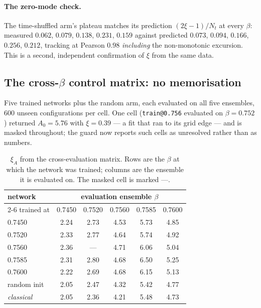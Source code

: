 \documentclass[11pt,a4paper]{article}
\newcommand{\xiA}{\xi_A}
\begin{document}
\paragraph{The zero-mode check.} The time-shuffled arm's plateau matches its
prediction $(2\xi-1)/N_t$ at every $\beta$: measured $0.062$, $0.079$, $0.138$,
$0.231$, $0.159$ against predicted $0.073$, $0.094$, $0.166$, $0.256$, $0.212$,
tracking at Pearson $0.98$ \emph{including} the non-monotonic excursion. This is
a second, independent confirmation of $\xi$ from the same data.

\subsection{The cross-$\beta$ control matrix: no memorisation}
\label{sec:cross}

Five trained networks plus the random arm, each evaluated on all five ensembles,
$600$ unseen configurations per cell. One cell (\texttt{train@0.756} evaluated on
$\beta=0.752$) returned $A_0 = 5.76$ with $\xi = 0.39$ --- a fit that ran to its
grid edge --- and is masked throughout; the guard now reports such cells as
unresolved rather than as numbers.

\begin{table}[htbp]
\centering
\caption{$\xiA$ from the cross-evaluation matrix. Rows are the $\beta$ at which
the network was trained; columns are the ensemble it is evaluated on. The
masked cell is marked ---.}
\label{tab:cross}
\begin{tabular}{@{}lccccc@{}}
\toprule
network & \multicolumn{5}{c}{evaluation ensemble $\beta$} \\
\cmidrule(l){2-6}
trained at & 0.7450 & 0.7520 & 0.7560 & 0.7585 & 0.7600 \\
\midrule
0.7450 & 2.24 & 2.73 & 4.53 & 5.73 & 4.85 \\
0.7520 & 2.33 & 2.77 & 4.64 & 5.74 & 4.92 \\
0.7560 & 2.36 & --- & 4.71 & 6.06 & 5.04 \\
0.7585 & 2.31 & 2.80 & 4.68 & 6.50 & 5.25 \\
0.7600 & 2.22 & 2.69 & 4.68 & 6.15 & 5.13 \\
\midrule
random init & 2.05 & 2.47 & 4.32 & 5.42 & 4.77 \\
\midrule
\emph{classical} & 2.05 & 2.36 & 4.21 & 5.48 & 4.73 \\
\bottomrule
\end{tabular}
\end{table}
\end{document}
